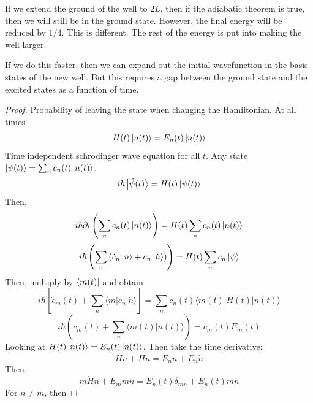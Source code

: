 \documentclass{article}
\newtheorem{one minute paper}[theorem]{One Minute Paper}
\begin{document}
If we extend the ground of the well to $2L$, then if the adiabatic theorem is true, then we will still be in the ground state. However, the final energy will be reduced by $1/4$. 
This is different. The rest of the energy is put into making the well larger. 

If we do this faster, then we can expand out the initial wavefunction in the basis states of the new well. But this requires a gap between the ground state and the excited states as a function of time. 

\begin{proof}
    Probability of leaving the state when changing the Hamiltonian. At all times 
    \begin{equation}
        H(t)\ket{n(t)} = E_n(t)\ket{n(t)}
    \end{equation}
    Time independent schrodinger wave equation for all $t$. Any state $\ket{\psi(t)} = \sum_n c_n(t)\ket{n(t)}$.
    \begin{equation}
        i\hbar \ket{\dot{\psi}(t)} = H(t)\ket{\psi(t)}
    \end{equation}
    Then, 
    \begin{equation}
        i\hbar \partial_t\left( \sum_n c_n(t)\ket{n(t)} \right) = H(t)\sum_n c_n(t)\ket{n(t)}
    \end{equation}
    \begin{equation}
        i\hbar \left( \sum_n \left( \dot{c}_n\ket{n} + c_n\ket{\dot{n}} \right) \right) = H(t)\sum_n c_n \ket{\psi}
    \end{equation}
    Then, multiply by $\bra{m(t)}$ and obtain 
    \begin{equation}
        i\hbar \left[ \dot{c}_m(t) + \sum_n \langle m | c_n | \dot{n} \rangle  \right]= \sum_n c_n(t) \langle m(t) | H(t) | n(t) \rangle
    \end{equation}
    \begin{equation}
        i\hbar\left( \dot{c}_m(t) + \sum_n  \langle m(t) | \dot{n}(t) \rangle \right) = c_m(t)E_m(t)
    \end{equation}
    Looking at $H(t)\ket{n(t)} = E_n(t)\ket{n(t)}$. Then take the time derivative:
    \begin{equation}
        \dot{H}n + H\dot{n} = \dot{E}_nn + E_n\dot{n}
    \end{equation}
    Then, 
    \begin{equation}
        m \dot{H} n + E_m m \dot{n} = E_n(t)\delta_{mn} + E_n(t) m \dot{n}
    \end{equation}
    For $n \neq m$, then 

\end{proof}
\end{document}
